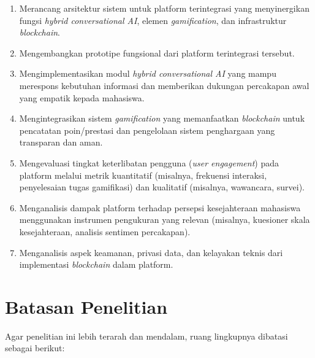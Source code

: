 \begin{enumerate}
    \item Merancang arsitektur sistem untuk platform terintegrasi yang menyinergikan fungsi \textit{hybrid conversational AI}, elemen \textit{gamification}, dan infrastruktur \textit{blockchain}.
    \item Mengembangkan prototipe fungsional dari platform terintegrasi tersebut.
    \item Mengimplementasikan modul \textit{hybrid conversational AI} yang mampu merespons kebutuhan informasi dan memberikan dukungan percakapan awal yang empatik kepada mahasiswa.
    \item Mengintegrasikan sistem \textit{gamification} yang memanfaatkan \textit{blockchain} untuk pencatatan poin/prestasi dan pengelolaan sistem penghargaan yang transparan dan aman.
    \item Mengevaluasi tingkat keterlibatan pengguna (\textit{user engagement}) pada platform melalui metrik kuantitatif (misalnya, frekuensi interaksi, penyelesaian tugas gamifikasi) dan kualitatif (misalnya, wawancara, survei).
    \item Menganalisis dampak platform terhadap persepsi kesejahteraan mahasiswa menggunakan instrumen pengukuran yang relevan (misalnya, kuesioner skala kesejahteraan, analisis sentimen percakapan).
    \item Menganalisis aspek keamanan, privasi data, dan kelayakan teknis dari implementasi \textit{blockchain} dalam platform.
\end{enumerate}


\section{Batasan Penelitian}
\label{sec:batasan_penelitian}

\noindent Agar penelitian ini lebih terarah dan mendalam, ruang lingkupnya dibatasi sebagai berikut:

